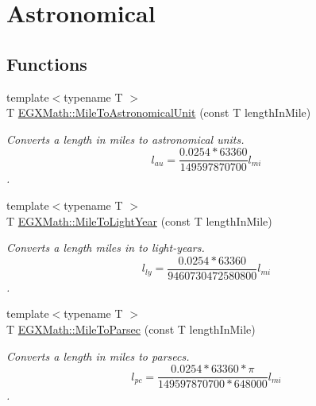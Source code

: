 \hypertarget{group___e_g_x_math-_conversions-_length_conversions-_imperial-_mile-_astronomical}{}\section{Astronomical}
\label{group___e_g_x_math-_conversions-_length_conversions-_imperial-_mile-_astronomical}
\subsection*{Functions}
\begin{DoxyCompactItemize}
\item 
{\footnotesize template$<$typename T $>$ }\\T \mbox{\hyperlink{group___e_g_x_math-_conversions-_length_conversions-_imperial-_mile-_astronomical_gae83082376f6746dd5f85433daad42331}{E\+G\+X\+Math\+::\+Mile\+To\+Astronomical\+Unit}} (const T length\+In\+Mile)
\begin{DoxyCompactList}\small\item\em Converts a length in miles to astronomical units. \[ l_{au}=\frac{0.0254 * 63360}{149597870700} l_{mi} \]. \end{DoxyCompactList}\item 
{\footnotesize template$<$typename T $>$ }\\T \mbox{\hyperlink{group___e_g_x_math-_conversions-_length_conversions-_imperial-_mile-_astronomical_ga45c1f0177f23bf7b798344319fb86909}{E\+G\+X\+Math\+::\+Mile\+To\+Light\+Year}} (const T length\+In\+Mile)
\begin{DoxyCompactList}\small\item\em Converts a length miles in to light-\/years. \[ l_{ly}=\frac{0.0254 * 63360}{9460730472580800} l_{mi} \]. \end{DoxyCompactList}\item 
{\footnotesize template$<$typename T $>$ }\\T \mbox{\hyperlink{group___e_g_x_math-_conversions-_length_conversions-_imperial-_mile-_astronomical_ga0f9493a3ad61ed0ddfa411b3f8edf6dc}{E\+G\+X\+Math\+::\+Mile\+To\+Parsec}} (const T length\+In\+Mile)
\begin{DoxyCompactList}\small\item\em Converts a length in miles to parsecs. \[ l_{pc}=\frac{0.0254 * 63360 * \pi}{149597870700 * 648000} l_{mi} \]. \end{DoxyCompactList}\end{DoxyCompactItemize}



